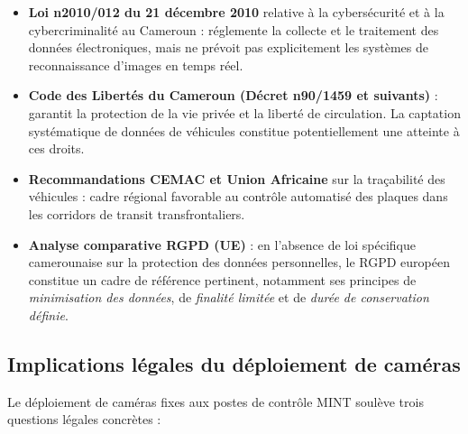 \begin{itemize}
  \item \textbf{Loi n\textordmasculine{}2010/012 du 21 d\'{e}cembre 2010} relative \`{a} la
        cybers\'{e}curit\'{e} et \`{a} la cybercriminalit\'{e} au Cameroun : r\'{e}glemente
        la collecte et le traitement des donn\'{e}es \'{e}lectroniques, mais ne pr\'{e}voit
        pas explicitement les syst\`{e}mes de reconnaissance d'images en temps r\'{e}el.
  \item \textbf{Code des Libert\'{e}s du Cameroun (D\'{e}cret n\textordmasculine{}90/1459 et
        suivants)} : garantit la protection de la vie priv\'{e}e et la libert\'{e}
        de circulation. La captation syst\'{e}matique de donn\'{e}es de v\'{e}hicules
        constitue potentiellement une atteinte \`{a} ces droits.
  \item \textbf{Recommandations CEMAC et Union Africaine} sur la tra\c{c}abilit\'{e}
        des v\'{e}hicules : cadre r\'{e}gional favorable au contr\^{o}le automatis\'{e}
        des plaques dans les corridors de transit transfrontaliers.
  \item \textbf{Analyse comparative RGPD (UE)} : en l'absence de loi sp\'{e}cifique
        camerounaise sur la protection des donn\'{e}es personnelles, le RGPD
        europ\'{e}en constitue un cadre de r\'{e}f\'{e}rence pertinent, notamment
        ses principes de \textit{minimisation des donn\'{e}es}, de \textit{finalit\'{e}
        limit\'{e}e} et de \textit{dur\'{e}e de conservation d\'{e}finie}.
\end{itemize}

\subsection{Implications l\'{e}gales du d\'{e}ploiement de cam\'{e}ras}
\label{sec:d:cameras}

Le d\'{e}ploiement de cam\'{e}ras fixes aux postes de contr\^{o}le MINT soul\`{e}ve
trois questions l\'{e}gales concr\`{e}tes :

